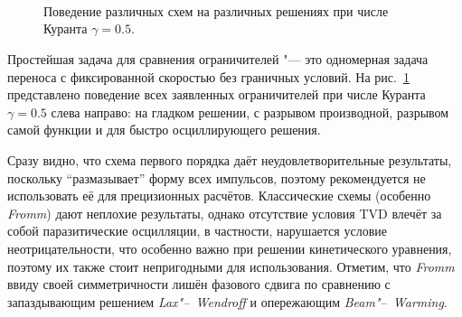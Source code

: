 \documentclass[a4paper,10pt]{article}
\begin{document}
\begin{figure}
	\\
	\\
	\\
	\centering{}
	\caption{Поведение различных схем на различных решениях при числе Куранта \(\gamma=0.5\).}\label{fig:conver}
\end{figure}

Простейшая задача для сравнения ограничителей "--- это одномерная задача переноса с фиксированной скоростью без граничных условий.
На рис.~\ref{fig:conver} представлено поведение всех заявленных ограничителей при числе Куранта \(\gamma=0.5\) слева направо:
на гладком решении, с разрывом производной, разрывом самой функции и для быстро осциллирующего решения.

Сразу видно, что схема первого порядка даёт неудовлетворительные результаты, поскольку ``размазывает'' форму всех импульсов,
поэтому рекомендуется не использовать её для прецизионных расчётов.
Классические схемы (особенно \textit{Fromm}) дают неплохие результаты, однако отсутствие условия TVD влечёт за собой паразитические осцилляции,
в частности, нарушается условие неотрицательности, что особенно важно при решении кинетического уравнения,
поэтому их также стоит непригодными для использования. Отметим, что \textit{Fromm} ввиду своей симметричности лишён фазового сдвига
по сравнению с запаздывающим решением \textit{Lax"--~Wendroff} и опережающим \textit{Beam"--~Warming}.
\end{document}
